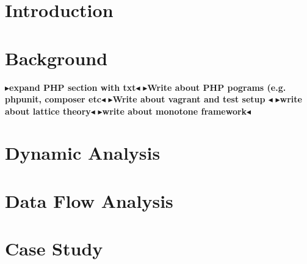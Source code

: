 \documentclass[twoside,11pt,openright]{report}
\theoremstyle{definition}
\newcommand{\todo}[1]{{\color[rgb]{.5,0,0}\textbf{$\blacktriangleright$#1$\blacktriangleleft$}}}
\begin{document}
\chapter{Introduction}
\label{ch:intro}


\chapter{Background}
\label{ch:background}

\todo{expand PHP section with txt}
\todo{Write about PHP pograms (e.g. phpunit, composer etc}
\todo{Write about vagrant and test setup }
\todo{write about lattice theory}
\todo{write about monotone framework}

\chapter{Dynamic Analysis}
\label{ch:study}



\chapter{Data Flow Analysis}
\label{ch:analysis}
%











\chapter{Case Study}
\label{ch:evaluation}







\end{document}
